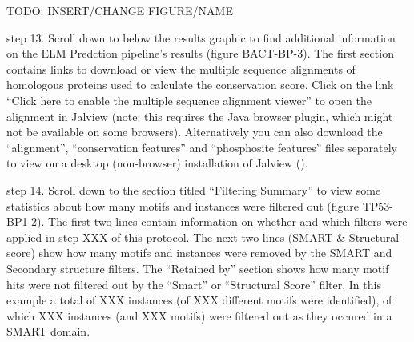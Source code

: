 TODO: INSERT/CHANGE FIGURE/NAME

step 13. Scroll down to below the results graphic to find additional
information on the ELM Predction pipeline's results (figure BACT-BP-3).
The first section contains links to download or view the multiple
sequence alignments of homologous proteins used to calculate the
conservation score. Click on the link ``Click here to enable the
multiple sequence alignment viewer'' to open the alignment in Jalview
(note: this requires the Java browser plugin, which might not be
available on some browsers). Alternatively you can also download the
``alignment'', ``conservation features'' and ``phosphosite features''
files separately to view on a desktop (non-browser) installation of
Jalview (\cite{19151095}).


step 14. Scroll down to the section titled ``Filtering Summary'' to view
some statistics about how many motifs and instances were filtered out
(figure TP53-BP1-2). The first two lines contain information on whether
and which filters were applied in step XXX of this protocol. The next
two lines (SMART \& Structural score) show how many motifs and instances
were removed by the SMART and Secondary structure filters. The
``Retained by'' section shows how many motif hits were not filtered out
by the ``Smart'' or ``Structural Score'' filter. In this example a total
of XXX instances (of XXX different motifs were identified), of which XXX
instances (and XXX motifs) were filtered out as they occured in a SMART
domain.


